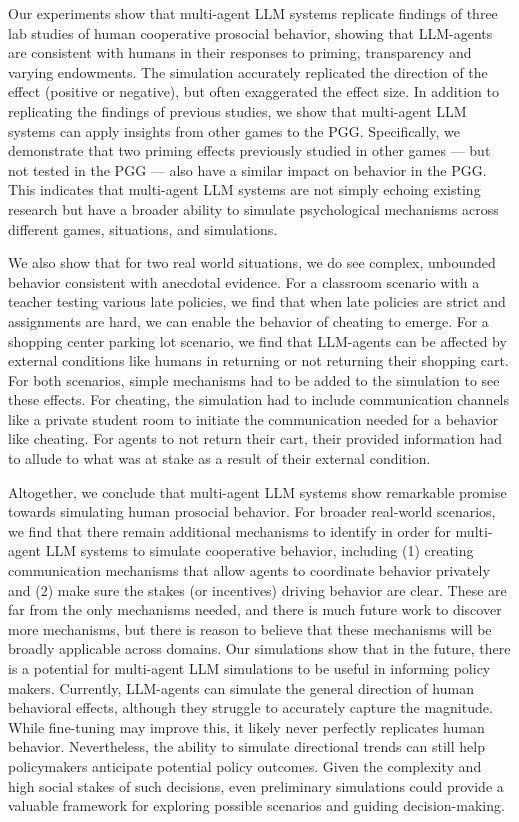Our experiments show that multi-agent LLM systems replicate findings of three lab studies of human cooperative prosocial behavior, showing that LLM-agents are consistent with humans in their responses to priming, transparency and varying endowments. The simulation accurately replicated the direction of the effect (positive or negative), but often exaggerated the effect size. In addition to replicating the findings of previous studies, we show that multi-agent LLM systems can apply insights from other games to the PGG. Specifically, we demonstrate that two priming effects previously studied in other games — but not tested in the PGG — also have a similar impact on behavior in the PGG. This indicates that multi-agent LLM systems are not simply echoing existing research but have a broader ability to simulate psychological mechanisms across different games, situations, and simulations.

We also show that for two real world situations, we do see complex, unbounded behavior consistent with anecdotal evidence. For a classroom scenario with a teacher testing various late policies, we find that when late policies are strict and assignments are hard, we can enable the behavior of cheating to emerge. For a shopping center parking lot scenario, we find that LLM-agents can be affected by external conditions like humans in returning or not returning their shopping cart. For both scenarios, simple mechanisms had to be added to the simulation to see these effects. For cheating, the simulation had to include communication channels like a private student room to initiate the communication needed for a behavior like cheating. For agents to not return their cart, their provided information had to allude to what was at stake as a result of their external condition.


Altogether, we conclude that multi-agent LLM systems show remarkable promise towards simulating human prosocial behavior.  
For broader real-world scenarios, we find that there remain additional mechanisms to identify in order for multi-agent LLM systems to simulate cooperative behavior, including (1) creating communication mechanisms that allow agents to coordinate behavior privately and (2) make sure the stakes (or incentives) driving behavior are clear. 
These are far from the only mechanisms needed, and there is much future work to discover more mechanisms, but there is reason to believe that these mechanisms
will be broadly applicable across domains. 
Our simulations show that in the future, there is a potential for multi-agent LLM simulations to be useful in informing policy makers. Currently, LLM-agents can simulate the general direction of human behavioral effects, although they struggle to accurately capture the magnitude. While fine-tuning may improve this, it likely never perfectly replicates human behavior. 
Nevertheless, the ability to simulate directional trends can still help policymakers anticipate potential policy outcomes. Given the complexity and high social stakes of such decisions, even preliminary simulations could provide a valuable framework for exploring possible scenarios and guiding decision-making.





